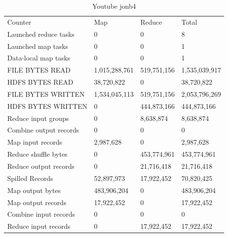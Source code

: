 \documentclass[paper=a4, fontsize=11pt]{scrartcl}	%
\numberwithin{equation}{section}															%
\numberwithin{figure}{section}																%
\numberwithin{table}{section}																%
\begin{document}
\begin{table}[]
	\centering
	\caption{Youtube jonb4}
	\label{my-label}
	\begin{tabular}{llll}
		Counter	&Map	&Reduce	&Total\\
		Launched reduce tasks&	0&	0&	8\\
		Launched map tasks&	0&	0&	1\\
		Data-local map tasks&	0&	0&	1\\
		FILE BYTES READ	&1,015,288,761&	519,751,156&	1,535,039,917\\
		HDFS BYTES READ&	38,720,822&	0&	38,720,822\\
		FILE BYTES WRITTEN&	1,534,045,113&	519,751,156&	2,053,796,269\\
		HDFS BYTES WRITTEN&	0&	444,873,166&	444,873,166\\
		Reduce input groups&	0&	8,638,874&	8,638,874\\
		Combine output records&	0&	0&	0\\
		Map input records&	2,987,628&	0&	2,987,628\\
		Reduce shuffle bytes&	0&	453,774,961&	453,774,961\\
		Reduce output records&	0&	21,716,418&	21,716,418\\
		Spilled Records&	52,897,973&	17,922,452&	70,820,425\\
		Map output bytes&	483,906,204&	0&	483,906,204\\
		Map output records&	17,922,452&	0&	17,922,452\\
		Combine input records&	0&	0&	0\\
		Reduce input records&	0&	17,922,452&	17,922,452\\
	\end{tabular}
\end{table}
\end{document}
